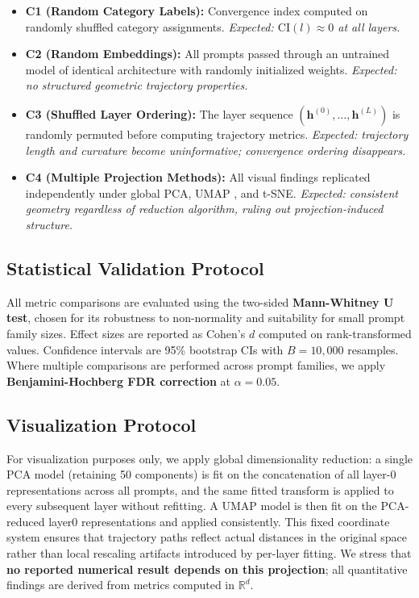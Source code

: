 \documentclass{article}
\begin{document}
\begin{itemize}
    \item \textbf{C1 (Random Category Labels):} Convergence index computed on randomly shuffled category assignments. \textit{Expected: $\text{CI}(l) \approx 0$ at all layers.}

    \item \textbf{C2 (Random Embeddings):} All prompts passed through an untrained model of identical architecture with randomly initialized weights. \textit{Expected: no structured geometric trajectory properties.}

    \item \textbf{C3 (Shuffled Layer Ordering):} The layer sequence $(\mathbf{h}^{(0)}, \dots, \mathbf{h}^{(L)})$ is randomly permuted before computing trajectory metrics. \textit{Expected: trajectory length and curvature become uninformative; convergence ordering disappears.}

    \item \textbf{C4 (Multiple Projection Methods):} All visual findings replicated independently under global PCA, UMAP \cite{mcinnes2018umap}, and t-SNE. \textit{Expected: consistent geometry regardless of reduction algorithm, ruling out projection-induced structure.}
\end{itemize}

\subsection{Statistical Validation Protocol}
\label{subsec:stats}

All metric comparisons are evaluated using the two-sided \textbf{Mann-Whitney U test}, chosen for its robustness to non-normality and suitability for small prompt family sizes. Effect sizes are reported as Cohen's $d$ computed on rank-transformed values. Confidence intervals are 95\% bootstrap CIs with $B = 10{,}000$ resamples. Where multiple comparisons are performed across prompt families, we apply \textbf{Benjamini-Hochberg FDR correction} at $\alpha = 0.05$.

\subsection{Visualization Protocol}
\label{subsec:viz}

For visualization purposes only, we apply global dimensionality reduction: a single PCA model (retaining 50 components) is fit on the concatenation of all layer-0 representations across all prompts, and the same fitted transform is applied to every subsequent layer without refitting. A UMAP model is then fit on the PCA-reduced layer0 representations and applied consistently. This fixed coordinate system ensures that trajectory paths reflect actual distances in the original space rather than local rescaling artifacts introduced by per-layer fitting. We stress that \textbf{no reported numerical result depends on this projection}; all quantitative findings are derived from metrics computed in $\mathbb{R}^d$.
\end{document}
